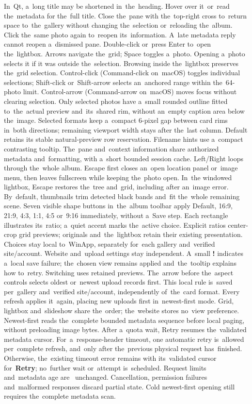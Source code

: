 \documentclass[11pt,a4paper]{article}
\newcommand{\ui}[1]{\textbf{#1}}
\begin{document}
In~Qt, a~long title may be
shortened in~the~heading. Hover over it~or~read the~metadata for the~full title.
Close the~pane with the~top-right
cross to~return space to~the~gallery without changing the~selection or~reloading
the~album. Click the~same photo again to~reopen its~information. A~late metadata
reply cannot reopen a~dismissed pane. Double-click or~press Enter
to~open the~lightbox. Arrows navigate the~grid; Space toggles a~photo.
Opening a~photo selects it if it was outside the~selection. Browsing inside
the~lightbox preserves the~grid selection.
Control-click (Command-click on~macOS) toggles individual selections;
Shift-click or~Shift-arrow selects an~anchored range within the~64-photo limit.
Control-arrow (Command-arrow on~macOS) moves focus without clearing selection.
Only selected photos have a~small rounded outline fitted to~the~actual preview
and~its~shared rim, without an~empty caption area below the~image. Selected
formats keep a~compact 6-pixel gap between card rims in~both directions;
remaining viewport width stays after the~last column. Default retains its
stable natural-preview row reservation.
Filename hints use a~compact
contrasting tooltip. The~pane and~context information share authorized metadata
and~formatting, with a~short bounded session cache. Left/Right loops through
the~whole album. Escape first closes an~open location panel or~image menu,
then leaves fullscreen while keeping the~photo open. In~the windowed
lightbox, Escape restores the~tree and~grid, including after an~image error.
By~default, thumbnails trim detected black bands and~fit the~whole
remaining scene. Seven visible shape buttons in~the~album toolbar apply
Default, 16:9, 21:9, 4:3, 1:1, 4:5 or~9:16 immediately, without a~Save step.
Each rectangle illustrates its~ratio; a~quiet accent marks the~active choice.
Explicit ratios center-crop grid previews; originals and~the~lightbox retain
their existing presentation. Choices stay local to~WinApp, separately for~each
gallery and~verified site/account. Website and~upload settings stay independent.
A~small \textbf{!} indicates a~local save failure; the~chosen view remains
applied and~the~tooltip explains how to~retry. Switching uses retained previews.
The~arrow before the~aspect controls selects oldest or~newest upload records
first. This local rule is~saved per~gallery and~verified site/account,
independently of~the~card format. Every refresh applies it~again, placing new
uploads first in~newest-first mode. Grid, lightbox and~slideshow share the~order;
the~website stores no~view preference. Newest-first reads the~complete bounded
metadata sequence before local paging, without preloading image bytes.
After a~quota wait, Retry resumes the~validated metadata cursor. For~a~response-header timeout, one automatic retry is~allowed per~complete
refresh, and~only after the~previous physical request has~finished. Otherwise,
the~existing timeout error remains with its~validated cursor for~\ui{Retry};
no~further wait or~attempt is~scheduled. Request limits and~metadata age are~
unchanged. Cancellation, permission failures and~malformed responses discard
partial state. Cold newest-first opening still requires the~complete metadata
scan.
\end{document}
